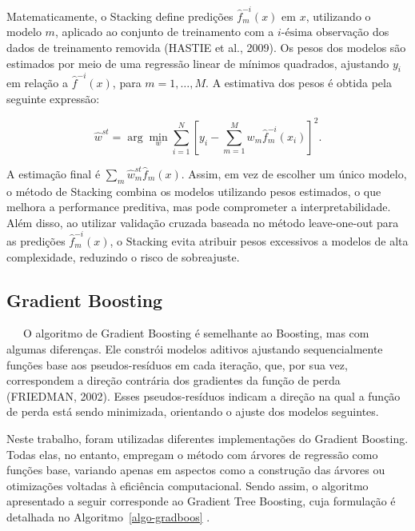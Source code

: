 \documentclass[
  12pt,
  a4paper,
]{scrreprt}
\begin{document}
Matematicamente, o Stacking define predições
\(\hat{f}_m^{-i}\left(x\right)\) em \(x\), utilizando o modelo \(m\),
aplicado ao conjunto de treinamento com a \(i\text{-ésima}\) observação
dos dados de treinamento removida (HASTIE et al., 2009). Os pesos dos
modelos são estimados por meio de uma regressão linear de mínimos
quadrados, ajustando \(y_i\) em relação a
\(\hat{f}^{-i}\left(x\right)\), para \(m=1,\dots,M\). A estimativa dos
pesos é obtida pela seguinte expressão:

\[
\hat{w}^{st} = \arg \min_{w} \sum^{N}_{i = 1} \left[y_i - \sum^{M}_{m = 1} w_m \hat{f}^{-i}_m\left(x_i\right)\right]^2\text{.}
\]

A estimação final é \(\sum_{m} \hat{w}_m^{st} \hat{f}_m\left(x\right)\).
Assim, em vez de escolher um único modelo, o método de Stacking combina
os modelos utilizando pesos estimados, o que melhora a performance
preditiva, mas pode comprometer a interpretabilidade. Além disso, ao
utilizar validação cruzada baseada no método leave-one-out para as
predições \(\hat{f}^{-i}_{m}\left(x\right)\), o Stacking evita atribuir
pesos excessivos a modelos de alta complexidade, reduzindo o risco de
sobreajuste.

\subsection{Gradient Boosting}\label{gradient-boosting}

~~~O algoritmo de Gradient Boosting é semelhante ao Boosting, mas com
algumas diferenças. Ele constrói modelos aditivos ajustando
sequencialmente funções base aos pseudos-resíduos em cada iteração, que,
por sua vez, correspondem a direção contrária dos gradientes da função
de perda (FRIEDMAN, 2002). Esses pseudos-resíduos indicam a direção na
qual a função de perda está sendo minimizada, orientando o ajuste dos
modelos seguintes.

\vspace{12pt}

Neste trabalho, foram utilizadas diferentes implementações do Gradient
Boosting. Todas elas, no entanto, empregam o método com árvores de
regressão como funções base, variando apenas em aspectos como a
construção das árvores ou otimizações voltadas à eficiência
computacional. Sendo assim, o algoritmo apresentado a seguir corresponde
ao Gradient Tree Boosting, cuja formulação é detalhada no
 Algoritmo~\ref{algo-gradboos} .
\end{document}
